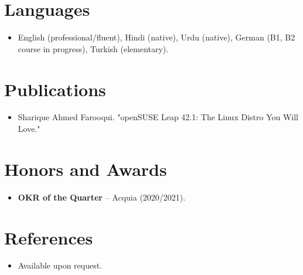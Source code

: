 \documentclass[11pt,a4paper,sans]{moderncv}
\begin{document}
\section{Languages}
\vspace{1pt}
\begin{itemize}
\item English (professional/fluent), Hindi (native), Urdu (native), German (B1, B2 course in progress), Turkish (elementary).
\end{itemize}


\section{Publications}
\vspace{1pt}
\begin{itemize}
\item Sharique Ahmed Farooqui. "openSUSE Leap 42.1: The Linux Distro You Will Love."
\end{itemize}


\section{Honors and Awards}
\vspace{1pt}
\begin{itemize}
\item{\textbf{OKR of the Quarter} -- Acquia (2020/2021).}
\end{itemize}


\section{References}
\vspace{1pt}
\begin{itemize}
\item{Available upon request.}
\end{itemize}
\end{document}
